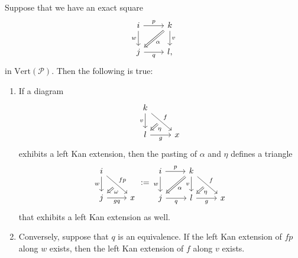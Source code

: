 \documentclass[a4paper, 11pt]{amsart}
\numberwithin{theorem}{section}
\theoremstyle{definition}
\renewcommand{\P}{\mathscr{P}}
\renewcommand{\Vert}{\mathrm{Vert}}
\begin{document}
\begin{proposition}\label{prop.exact-squares}
	Suppose that we have an exact square
	\[
		\begin{tikzcd}
			i \arrow[r, "p"]\arrow[d,"w"'] &|[alias=f]| k \arrow[d, "v"] \\ 
			|[alias=t]|j \arrow[r, "q"'] & l, 
			\arrow[from=f,to=t, Rightarrow, "\alpha"]
		\end{tikzcd}
	\]
 	in $\Vert(\P)$. Then the following is true: 
	\begin{enumerate}
		\item If a diagram \[
			\begin{tikzcd}
				k \arrow[dr, "f"name=f]\arrow[d,"v"']  \\
				|[alias=t]|l \arrow[r, "g"'] & x
				\arrow[from=f, to=t, Rightarrow, shorten <= 6pt, "\eta"]
			\end{tikzcd}
		\] exhibits a left Kan extension, then the pasting of $\alpha$ and $\eta$ defines a triangle
		\[
			\begin{tikzcd}
				i \arrow[dr, "fp"name=f]\arrow[d,"w"']  \\
				|[alias=t]|j \arrow[r, "gq"'] & x
				\arrow[from=f, to=t, Rightarrow, shorten <= 6pt, "\omega"]
			\end{tikzcd}
			:= 
			\begin{tikzcd}
				i \arrow[r,"p"]\arrow[d,"w"'] &|[alias=f0]| k \arrow[dr, "f"name=f]\arrow[d,"v"']  \\
				|[alias=t0]| j \arrow[r, "q"'] & |[alias=t]|l \arrow[r, "g"'] & x
				\arrow[from=f, to=t, Rightarrow, shorten <= 6pt, "\eta"]
				\arrow[from=f0,to=t0, Rightarrow, "\alpha"]
			\end{tikzcd}
		\]
		that exhibits a left Kan extension as well.
		\item Conversely, suppose that $q$ is an equivalence. If the left Kan extension of $fp$ along $w$ exists, then 
		the left Kan extension of $f$ along $v$ exists.
	\end{enumerate}
\end{proposition}
\end{document}
